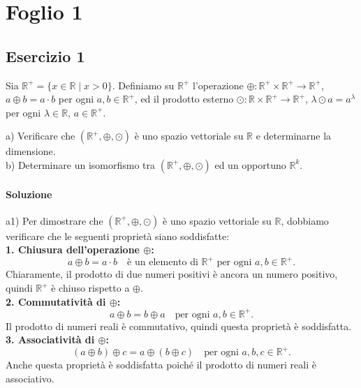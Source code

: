 \section{Foglio 1}

	

	\subsection{Esercizio 1} Sia \(\mathbb{R}^+ = \{x \in \mathbb{R} \mid x > 0\}\). Definiamo su \(\mathbb{R}^+\) l'operazione \(\oplus : \mathbb{R}^+ \times \mathbb{R}^+ \to \mathbb{R}^+\), \(a \oplus b = a \cdot b\) per ogni \(a, b \in \mathbb{R}^+\), ed il prodotto esterno \(\odot : \mathbb{R} \times \mathbb{R}^+ \to \mathbb{R}^+\), \(\lambda \odot a = a^\lambda\) per ogni \(\lambda \in \mathbb{R}\), \(a \in \mathbb{R}^+\).
	
	
	a) Verificare che \((\mathbb{R}^+, \oplus, \odot)\) è uno spazio vettoriale su \(\mathbb{R}\) e determinarne la dimensione. \\
	b) Determinare un isomorfismo tra \((\mathbb{R}^+, \oplus, \odot)\) ed un opportuno \(\mathbb{R}^k\). \\
	
	\paragraph{Soluzione}
	a1) Per dimostrare che \((\mathbb{R}^+, \oplus, \odot)\) è uno spazio vettoriale su \(\mathbb{R}\), dobbiamo verificare che le seguenti proprietà siano soddisfatte: \\
	
	\textbf{1. Chiusura dell'operazione \(\oplus\):}
	\[
	a \oplus b = a \cdot b \quad \text{è un elemento di } \mathbb{R}^+ \text{ per ogni } a, b \in \mathbb{R}^+.
	\]
	Chiaramente, il prodotto di due numeri positivi è ancora un numero positivo, quindi \(\mathbb{R}^+\) è chiuso rispetto a \(\oplus\). \\
	
	\textbf{2. Commutatività di \(\oplus\):}
	\[
	a \oplus b = b \oplus a \quad \text{per ogni } a, b \in \mathbb{R}^+.
	\]
	Il prodotto di numeri reali è commutativo, quindi questa proprietà è soddisfatta. \\
	
	\textbf{3. Associatività di \(\oplus\):}
	\[
	(a \oplus b) \oplus c = a \oplus (b \oplus c) \quad \text{per ogni } a, b, c \in \mathbb{R}^+.
	\]
	Anche questa proprietà è soddisfatta poiché il prodotto di numeri reali è associativo. \\
	

